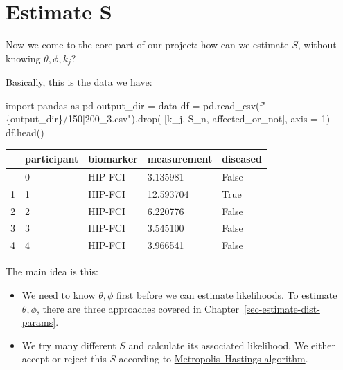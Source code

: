 \documentclass[
  letterpaper,
  DIV=11,
  numbers=noendperiod]{scrreprt}
\newenvironment{Shaded}{\begin{snugshade}}{\end{snugshade}}
\newcommand{\DecValTok}[1]{\textcolor[rgb]{0.68,0.00,0.00}{#1}}
\newcommand{\ImportTok}[1]{\textcolor[rgb]{0.00,0.46,0.62}{#1}}
\newcommand{\NormalTok}[1]{\textcolor[rgb]{0.00,0.23,0.31}{#1}}
\newcommand{\OperatorTok}[1]{\textcolor[rgb]{0.37,0.37,0.37}{#1}}
\newcommand{\SpecialCharTok}[1]{\textcolor[rgb]{0.37,0.37,0.37}{#1}}
\newcommand{\SpecialStringTok}[1]{\textcolor[rgb]{0.13,0.47,0.30}{#1}}
\newcommand{\StringTok}[1]{\textcolor[rgb]{0.13,0.47,0.30}{#1}}
\begin{document}

\chapter{Estimate S}\label{estimate-s}

Now we come to the core part of our project: how can we estimate \(S\),
without knowing \(\theta, \phi, k_j\)?

Basically, this is the data we have:

\begin{Shaded}
\begin{Highlighting}[]
\ImportTok{import}\NormalTok{ pandas }\ImportTok{as}\NormalTok{ pd }
\NormalTok{output\_dir }\OperatorTok{=} \StringTok{\textquotesingle{}data\textquotesingle{}}
\NormalTok{df }\OperatorTok{=}\NormalTok{ pd.read\_csv(}\SpecialStringTok{f"}\SpecialCharTok{\{}\NormalTok{output\_dir}\SpecialCharTok{\}}\SpecialStringTok{/150|200\_3.csv"}\NormalTok{).drop(}
\NormalTok{    [}\StringTok{\textquotesingle{}k\_j\textquotesingle{}}\NormalTok{, }\StringTok{\textquotesingle{}S\_n\textquotesingle{}}\NormalTok{, }\StringTok{\textquotesingle{}affected\_or\_not\textquotesingle{}}\NormalTok{], axis }\OperatorTok{=} \DecValTok{1}\NormalTok{)}
\NormalTok{df.head()}
\end{Highlighting}
\end{Shaded}

\begin{longtable}[]{@{}lllll@{}}
\toprule\noalign{}
& participant & biomarker & measurement & diseased \\
\midrule\noalign{}
\endhead
\bottomrule\noalign{}
\endlastfoot
0 & 0 & HIP-FCI & 3.135981 & False \\
1 & 1 & HIP-FCI & 12.593704 & True \\
2 & 2 & HIP-FCI & 6.220776 & False \\
3 & 3 & HIP-FCI & 3.545100 & False \\
4 & 4 & HIP-FCI & 3.966541 & False \\
\end{longtable}

The main idea is this:

\begin{itemize}
\item
  We need to know \(\theta, \phi\) first before we can estimate
  likelihoods. To estimate \(\theta, \phi\), there are three approaches
  covered in Chapter~\ref{sec-estimate-dist-params}.
\item
  We try many different \(S\) and calculate its associated likelihood.
  We either accept or reject this \(S\) according to
  \href{https://en.wikipedia.org/wiki/Metropolis\%E2\%80\%93Hastings_algorithm}{Metropolis--Hastings
  algorithm}.
\end{itemize}
\end{document}
